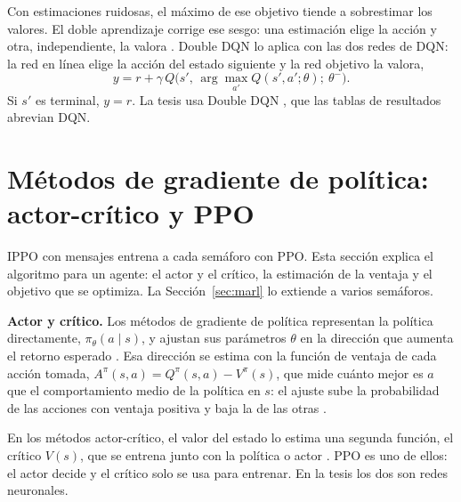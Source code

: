 Con estimaciones ruidosas, el máximo de ese objetivo tiende a sobrestimar los valores. El doble
aprendizaje corrige ese sesgo: una estimación elige la acción y otra, independiente, la valora
\citep{SuttonBarto2018}. Double DQN lo aplica con las dos redes de DQN: la red en línea elige la
acción del estado siguiente y la red objetivo la valora,
\begin{equation}
  y = r + \gamma\, Q\bigl(s',\, \arg\max_{a'} Q(s',a';\theta);\ \theta^-\bigr).
  \label{eq:double-dqn}
\end{equation}
Si $s'$ es terminal, $y = r$. La tesis usa Double DQN \citep{vanHasselt2016_DoubleDQN}, que las tablas de
resultados abrevian DQN.

\section{Métodos de gradiente de política: actor-crítico y PPO}
\label{sec:ppo}

IPPO con mensajes entrena a cada semáforo con PPO. Esta sección explica el algoritmo para un
agente: el actor y el crítico, la estimación de la ventaja y el objetivo que se optimiza. La
Sección~\ref{sec:marl} lo extiende a varios semáforos.

\noindent\textbf{Actor y crítico.} Los métodos de gradiente de política representan la política
directamente, $\pi_\theta(a \mid s)$, y ajustan sus parámetros $\theta$ en la dirección que
aumenta el retorno esperado \citep{SuttonBarto2018}. Esa dirección se estima con la función de
ventaja de cada acción tomada, $A^\pi(s,a) = Q^\pi(s,a) - V^\pi(s)$, que mide cuánto mejor es $a$ que el
comportamiento medio de la política en $s$: el ajuste sube la probabilidad de las acciones con
ventaja positiva y baja la de las otras \citep{Schulman2017_PPO}.

En los métodos actor-crítico, el valor del estado lo estima una segunda función, el crítico
$V(s)$, que se entrena junto con la política o actor \citep{SuttonBarto2018}. PPO es uno de ellos:
el actor decide y el crítico solo se usa para entrenar. En la tesis los dos son redes neuronales.

